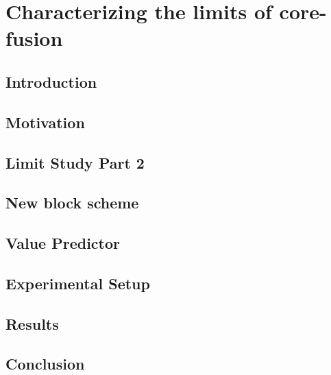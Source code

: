 \chapter{Characterizing the limits of core-fusion}

\section{Introduction}\label{sect:introduction-chapter3}

\section{Motivation}\label{sect:ch3-motivation}

\section{Limit Study Part 2}

\section{New block scheme}

\section{Value Predictor}

\section{Experimental Setup}
\section{Results}
\section{Conclusion}
%
%
%